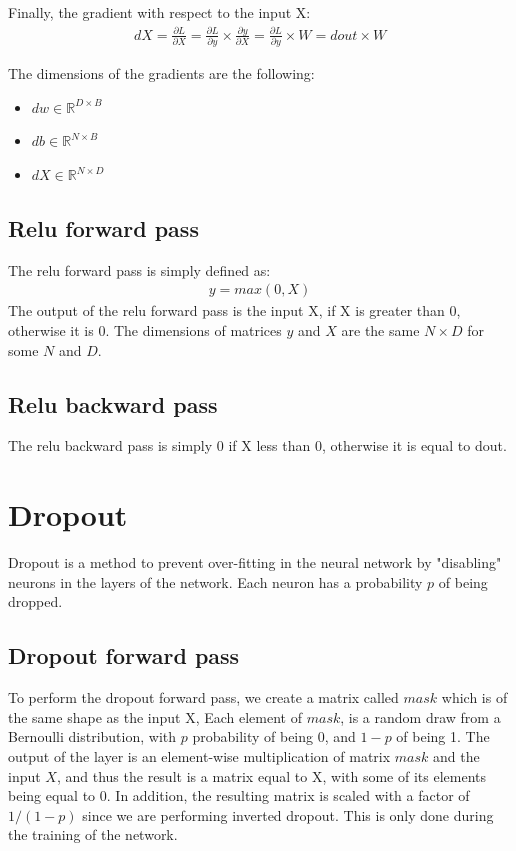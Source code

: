 \documentclass[12pt,twoside]{article}
\begin{document}
Finally, the gradient with respect to the input X:
\begin{align}
dX = \frac{\partial L}{\partial X} = \frac{\partial L}{\partial y} \times \frac{\partial y}{\partial X} = \frac{\partial L}{\partial y} \times W = dout \times W
\end{align}

The dimensions of the gradients are the following:
\begin{itemize}
\item $dw \in \mathbb{R}^{D \times B}$
\item $db \in \mathbb{R}^{N \times B}$
\item $dX \in \mathbb{R}^{N \times D}$
\end{itemize}

\subsection{Relu forward pass}

The relu forward pass is simply defined as:
\begin{align}
y = max(0,X)
\end{align}
The output of the relu forward pass is the input X, if X is greater than 0, otherwise it is 0. The dimensions of matrices $y$ and $X$ are the same $N \times D$ for some $N$ and $D$.

\subsection{Relu backward pass}

The relu backward pass is simply 0 if X less than 0, otherwise it is equal to dout.

\section{Dropout}
Dropout is a method to prevent over-fitting in the neural network by "disabling" neurons in the layers of the network. Each neuron has a probability $p$ of being dropped.

\subsection{Dropout forward pass}
To perform the dropout forward pass, we create a matrix called $mask$ which is of the same shape as the input X, Each element of $mask$, is a random draw from a Bernoulli distribution, with $p$ probability of being $0$, and $1-p$ of being 1. The output of the layer is an element-wise multiplication of matrix $mask$ and the input $X$, and thus the result is a matrix equal to X, with some of its elements being equal to 0. In addition, the resulting matrix is scaled with a factor of $1/(1-p)$ since we are performing inverted dropout. This is only done during the training of the network.
\end{document}
